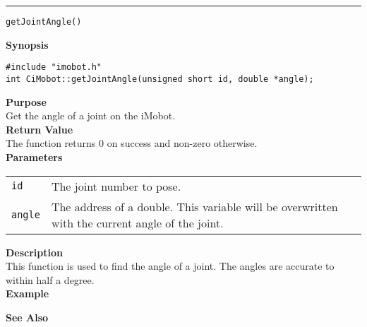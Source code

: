 \noindent
\vspace{5pt}
\rule{6.5in}{0.015in}
\noindent
{\LARGE \texttt{getJointAngle()}}\\
{}

\noindent
{\bf Synopsis}\\
\begin{verbatim}
#include "imobot.h"
int CiMobot::getJointAngle(unsigned short id, double *angle);
\end{verbatim}

\noindent
{\bf Purpose}\\
Get the angle of a joint on the iMobot.\\

\noindent
{\bf Return Value}\\
The function returns 0 on success and non-zero otherwise.\\

\noindent
{\bf Parameters}
\vspace{-0.1in}
\begin{description}
\item               
\begin{tabular}{p{10 mm}p{145 mm}}
\texttt{id} & The joint number to pose. \\
\texttt{angle} & The address of a double. This variable will be overwritten
with the current angle of the joint.
\end{tabular}
\end{description}

\noindent
{\bf Description}\\
This function is used to find the angle of a joint. The angles are accurate to
within half a degree. \\

\noindent
{\bf Example}\\
\noindent

\noindent
{\bf See Also}\\

